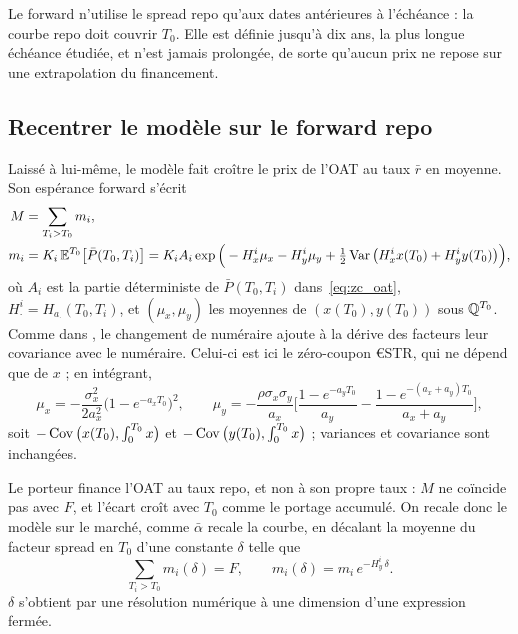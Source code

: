 Le forward n'utilise le spread repo qu'aux dates antérieures à l'échéance : la courbe repo doit couvrir $T_0$.
Elle est définie jusqu'à dix ans, la plus longue échéance étudiée, et n'est jamais prolongée, de sorte qu'aucun
prix ne repose sur une extrapolation du financement.

\subsection{Recentrer le modèle sur le forward repo}

Laissé à lui-même, le modèle fait croître le prix de l'OAT au taux $\bar r$ en moyenne. Son espérance forward
s'écrit
\begin{equation}
\begin{split}
M &= \sum_{T_i>T_0} m_i,\\
m_i &= K_i\,\mathbb{E}^{T_0}\big[\bar P(T_0,T_i)\big]
= K_i A_i\exp\Big(-H_x^i\mu_x - H_y^i\mu_y + \tfrac12\operatorname{Var}\big(H_x^i x(T_0) + H_y^i y(T_0)\big)\Big),
\end{split}
\end{equation}
où $A_i$ est la partie déterministe de $\bar P(T_0,T_i)$ dans~\eqref{eq:zc_oat}, $H^i_\cdot = H_{a_\cdot}(T_0,T_i)$,
et $(\mu_x,\mu_y)$ les moyennes de $(x(T_0),y(T_0))$ sous $\mathbb{Q}^{T_0}$. Comme dans
\citet[lemme~4.2.2]{BrigoMercurio2006}, le changement de numéraire ajoute à la dérive des facteurs leur covariance
avec le numéraire. Celui-ci est ici le zéro-coupon €STR, qui ne dépend que de $x$ ; en intégrant,
\begin{equation}
\mu_x = -\frac{\sigma_x^2}{2a_x^2}\big(1-e^{-a_xT_0}\big)^2,\qquad
\mu_y = -\frac{\rho\sigma_x\sigma_y}{a_x}\Big[\frac{1-e^{-a_yT_0}}{a_y} - \frac{1-e^{-(a_x+a_y)T_0}}{a_x+a_y}\Big],
\end{equation}
soit $-\operatorname{Cov}\big(x(T_0),\int_0^{T_0}x\big)$ et $-\operatorname{Cov}\big(y(T_0),\int_0^{T_0}x\big)$ ; variances et covariance
sont inchangées.

Le porteur finance l'OAT au taux repo, et non à son propre taux : $M$ ne coïncide pas avec $F$, et l'écart croît
avec $T_0$ comme le portage accumulé. On recale donc le modèle sur le marché, comme $\bar\alpha$ recale la
courbe, en décalant la moyenne du facteur spread en $T_0$ d'une constante $\delta$ telle que
\begin{equation}
\sum_{T_i>T_0} m_i(\delta) = F,\qquad m_i(\delta) = m_i\,e^{-H_y^i\,\delta}.
\label{eq:recentrage}
\end{equation}
$\delta$ s'obtient par une résolution numérique à une dimension d'une expression fermée.

